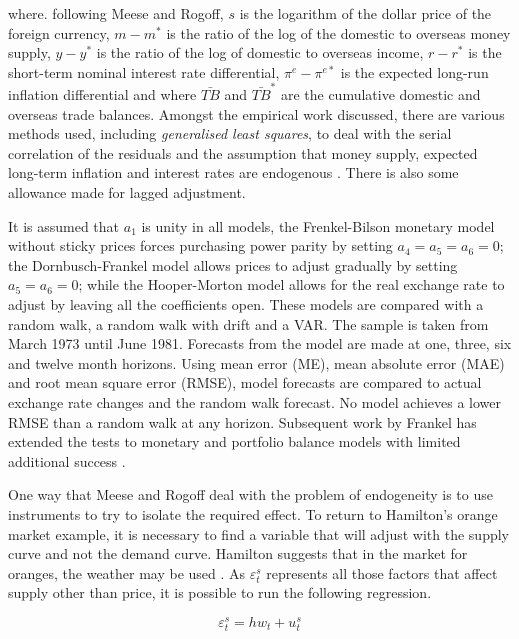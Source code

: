 \documentclass[12pt, a4paper, oneside]{article}\usepackage[]{graphicx}\usepackage[]{color}
\begin{document}
where. following Meese and Rogoff,  $s$ is the logarithm of the dollar price of the foreign currency, $m-m^*$ is the ratio of the log of the domestic to overseas money supply, $y-y^*$ is the ratio of the log of domestic to overseas income, $r-r^*$ is the short-term nominal interest rate differential, $\pi^{e}-\pi^{e*}$ is the expected long-run inflation differential and where $\bar{TB}$ and $\bar{TB}^*$ are the cumulative domestic and overseas trade balances.   Amongst the empirical work discussed, there are various methods used, including \emph{generalised least squares}, to deal with the serial correlation of the residuals and the assumption that money supply, expected long-term inflation and interest rates are endogenous \citep{Fair1970}.  There is also some allowance made for lagged adjustment. 

It is assumed that $a_{1}$ is unity in all models, the Frenkel-Bilson monetary model without sticky prices forces purchasing power parity by setting $a_{4}=a_{5}=a_{6}=0$; the Dornbusch-Frankel model allows prices to adjust gradually by setting $a_{5}=a_{6}=0$; while the Hooper-Morton model allows for the real exchange rate to adjust by leaving all the coefficients open.  These models are compared with a random walk, a random walk with drift and a VAR.  The sample is taken from March 1973 until June 1981.  Forecasts from the model are made at one, three, six and twelve month horizons.   Using mean error (ME), mean absolute error (MAE) and root mean square error (RMSE), model forecasts are compared to actual exchange rate changes and the random walk forecast.  No model achieves a lower RMSE than a random walk at any horizon.  Subsequent work by Frankel has extended the tests to monetary and portfolio balance models with limited additional success \citep{Frankel1984tests}. 

One way that Meese and Rogoff deal with the problem of endogeneity is to use instruments to try to isolate the required effect.   To return to Hamilton's orange market example, it is necessary to find a variable that will adjust with the supply curve and not the demand curve.  Hamilton suggests that in the market for oranges, the weather may be used \citep[p. 235]{Hamilton}.  As $\varepsilon_t^s$ represents all those factors that affect supply other than price, it is possible  to run the following regression. 

\begin{equation}
\label{eqref:ins}
\varepsilon_t^s = hw_t + u_t^s
\end{equation}
\end{document}
